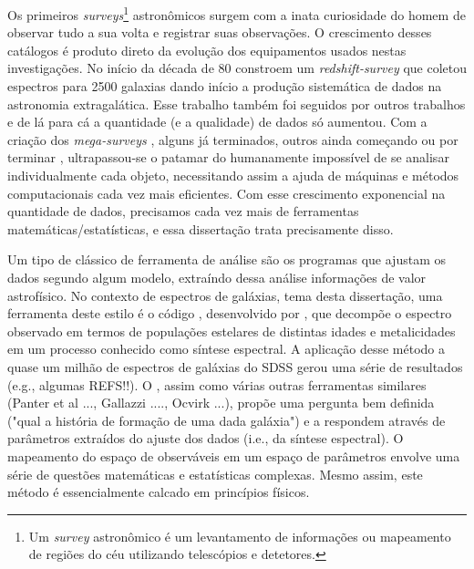 Os primeiros {\em surveys}\footnote{Um {\em survey} astronômico é um levantamento de informações ou mapeamento de
regiões do céu utilizando telescópios e detetores.} astronômicos surgem com a inata curiosidade do homem de observar
tudo a sua volta e registrar suas observações. O crescimento desses catálogos é produto direto da evolução dos
equipamentos usados nestas investigações. No início da década de 80 \citet{Huchra1983} constroem um {\em
redshift-survey} que coletou espectros para 2500 galaxias dando início a produção sistemática de dados na astronomia extragalática. Esse
trabalho também foi seguidos por outros trabalhos \citep[e.g., ][]{Huchra1988, DaCosta1988} e de lá para cá a
quantidade (e a qualidade) de dados só aumentou. Com a criação dos {\em mega-surveys} \citep[\SDSS; ][]{York2000}
\citep[2dFGRS;][]{Colless1999} \citep[2MASS;][]{Skrutskie2006}, alguns já terminados, outros ainda começando ou por
terminar \citep[LSST; ][]{Ivezic2008} \citep[J-PAS;][]{Benitez2009}, ultrapassou-se o patamar do humanamente impossível
de se analisar individualmente cada objeto, necessitando assim a ajuda de máquinas e métodos computacionais cada vez
mais eficientes. Com esse crescimento exponencial na quantidade de dados, precisamos cada vez mais de ferramentas
matemáticas/estatísticas, e essa dissertação trata precisamente disso.

Um tipo de clássico de ferramenta de análise são os programas que ajustam os dados segundo algum modelo, extraíndo dessa
análise informações de valor astrofísico. No contexto de espectros de galáxias, tema desta dissertação, uma ferramenta
deste estilo é o código \starlight, desenvolvido por \citet{CidFernandes2005}, que decompõe o espectro observado em
termos de populações estelares de distintas idades e metalicidades em um processo conhecido como síntese espectral.
A aplicação desse método a quase um milhão de espectros de galáxias do SDSS gerou uma série de resultados \ojo (e.g.,
algumas REFS!!). O \starlight, assim como várias outras ferramentas similares \ojo (Panter et al ..., Gallazzi ....,
Ocvirk ...), propõe uma pergunta bem definida ("qual a história de formação de uma dada galáxia") e a respondem através
de parâmetros extraídos do ajuste dos dados (i.e., da síntese espectral). O mapeamento do espaço de observáveis em um
espaço de parâmetros envolve uma série de questões matemáticas e estatísticas complexas. Mesmo assim, este método é
essencialmente calcado em princípios físicos.

